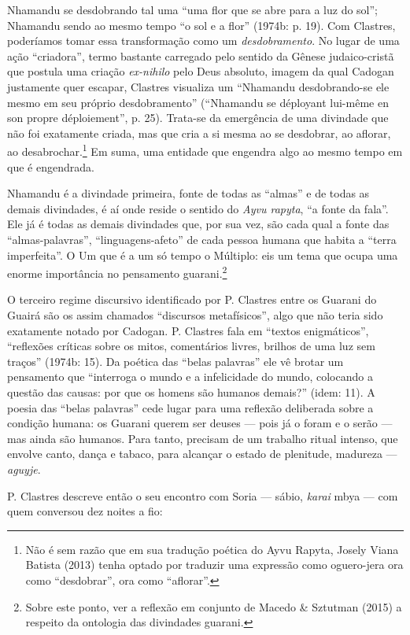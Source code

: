 Nhamandu se desdobrando tal uma ``uma flor que se abre para a luz do
sol''; Nhamandu sendo ao mesmo tempo ``o sol e a flor'' (1974b: p. 19).
Com Clastres, poderíamos tomar essa transformação como um
\emph{desdobramento}. No lugar de uma ação ``criadora'', termo bastante
carregado pelo sentido da Gênese judaico-cristã que postula uma criação
\emph{ex-nihilo} pelo Deus absoluto, imagem da qual Cadogan justamente
quer escapar, Clastres visualiza um ``Nhamandu desdobrando-se ele mesmo
em seu próprio desdobramento'' (``Nhamandu se déployant lui-même en son
propre déploiement'', p. 25). Trata-se da emergência de uma divindade
que não foi exatamente criada, mas que cria a si mesma ao se desdobrar,
ao aflorar, ao desabrochar.\footnote{Não é sem razão que em sua tradução
  poética do Ayvu Rapyta, Josely Viana Batista (2013) tenha optado por
  traduzir uma expressão como oguero-jera ora como ``desdobrar'', ora
  como ``aflorar''.} Em suma, uma entidade que engendra algo ao mesmo
tempo em que é engendrada.

Nhamandu é a divindade primeira, fonte de todas as ``almas'' e de todas
as demais divindades, é aí onde reside o sentido do \emph{Ayvu rapyta},
``a fonte da fala''. Ele já é todas as demais divindades que, por sua
vez, são cada qual a fonte das ``almas-palavras'', ``linguagens-afeto''
de cada pessoa humana que habita a ``terra imperfeita''. O Um que é a um
só tempo o Múltiplo: eis um tema que ocupa uma enorme importância no
pensamento guarani.\footnote{Sobre este ponto, ver a reflexão em
  conjunto de Macedo \& Sztutman (2015) a respeito da ontologia das
  divindades guarani.}

O terceiro regime discursivo identificado por P. Clastres entre os
Guarani do Guairá são os assim chamados ``discursos metafísicos'', algo
que não teria sido exatamente notado por Cadogan. P. Clastres fala em
``textos enigmáticos'', ``reflexões críticas sobre os mitos, comentários
livres, brilhos de uma luz sem traços'' (1974b: 15). Da poética das
``belas palavras'' ele vê brotar um pensamento que ``interroga o mundo e
a infelicidade do mundo, colocando a questão das causas: por que os
homens são humanos demais?'' (idem: 11). A poesia das ``belas palavras''
cede lugar para uma reflexão deliberada sobre a condição humana: os
Guarani querem ser deuses --- pois já o foram e o serão --- mas ainda
são humanos. Para tanto, precisam de um trabalho ritual intenso, que
envolve canto, dança e tabaco, para alcançar o estado de plenitude,
madureza --- \emph{aguyje}.

P. Clastres descreve então o seu encontro com Soria --- sábio,
\emph{karai} mbya --- com quem conversou dez noites a fio:


